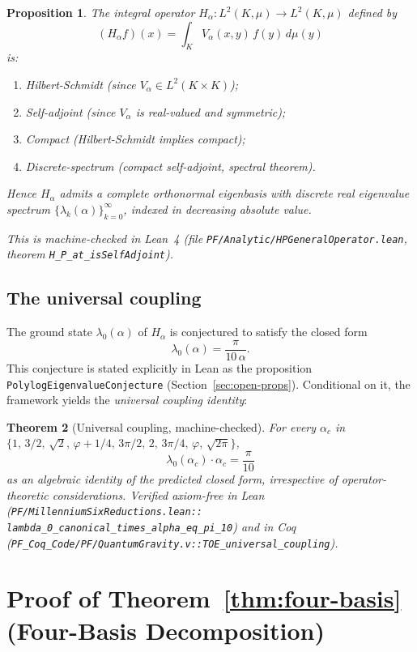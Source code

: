 \documentclass[11pt,a4paper]{article}
\newtheorem{theorem}{Theorem}[section]
\newtheorem{proposition}[theorem]{Proposition}
\theoremstyle{definition}
\theoremstyle{remark}
\begin{document}
\begin{proposition}\label{prop:H-alpha-properties}
The integral operator $H_\alpha\colon L^2(K, \mu) \to L^2(K, \mu)$
defined by
\[
(H_\alpha f)(x) = \int_K V_\alpha(x,y)\, f(y)\, d\mu(y)
\]
is:
\begin{enumerate}
\item Hilbert-Schmidt (since $V_\alpha \in L^2(K \times K)$);
\item Self-adjoint (since $V_\alpha$ is real-valued and symmetric);
\item Compact (Hilbert-Schmidt implies compact);
\item Discrete-spectrum (compact self-adjoint, spectral theorem).
\end{enumerate}
Hence $H_\alpha$ admits a complete orthonormal eigenbasis with discrete
real eigenvalue spectrum $\{\lambda_k(\alpha)\}_{k=0}^\infty$, indexed
in decreasing absolute value.

This is machine-checked in Lean~4 (file
\texttt{PF/Analytic/HPGeneralOperator.lean}, theorem
\texttt{H\_P\_at\_isSelfAdjoint}).
\end{proposition}

\subsection{The universal coupling}

The ground state $\lambda_0(\alpha)$ of $H_\alpha$ is conjectured to
satisfy the closed form
\[
\lambda_0(\alpha) = \frac{\pi}{10\,\alpha}.
\]
This conjecture is stated explicitly in
Lean as the proposition
\texttt{PolylogEigenvalueConjecture} (Section~\ref{sec:open-props}).
Conditional on it, the framework yields the \emph{universal coupling
identity}:

\begin{theorem}[Universal coupling, machine-checked]\label{thm:universal-coupling}
For every $\alpha_c$ in $\{1,\, 3/2,\, \sqrt{2},\, \varphi+1/4,\,
3\pi/2,\, 2,\, 3\pi/4,\, \varphi,\, \sqrt{2\pi}\}$,
\[
\lambda_0(\alpha_c)\cdot \alpha_c = \frac{\pi}{10}
\]
as an algebraic identity of the predicted closed form, irrespective
of operator-theoretic considerations. Verified axiom-free in Lean
(\texttt{PF/MillenniumSixReductions.lean::\\lambda\_0\_canonical\_times\_alpha\_eq\_pi\_10})
and in Coq (\texttt{PF\_Coq\_Code/PF/QuantumGravity.v::TOE\_universal\_coupling}).
\end{theorem}

\section{Proof of Theorem~\ref{thm:four-basis} (Four-Basis Decomposition)}
\end{document}
